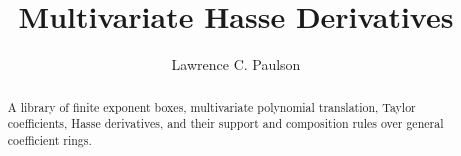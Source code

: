 \documentclass[11pt,a4paper]{article}
\begin{document}
\title{Multivariate Hasse Derivatives}
\author{Lawrence C. Paulson}
\maketitle
\begin{abstract}
A library of finite exponent boxes, multivariate polynomial translation,
Taylor coefficients, Hasse derivatives, and their support and composition
rules over general coefficient rings.
\end{abstract}

\end{document}
